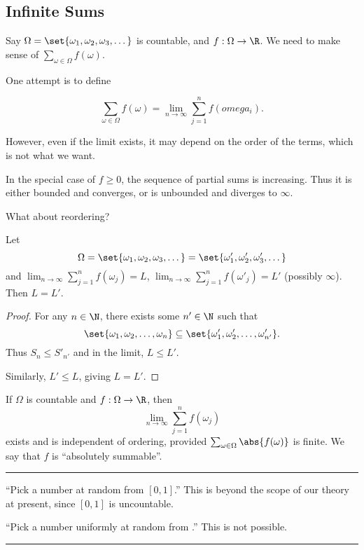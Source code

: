 
\subsection{Infinite Sums} \label{sec:infinite_sums}
Say $\Omega = \set{\omega_1, \omega_2, \omega_3, \dots}$ is countable, and
$f : \Omega \to \R$.
We need to make sense of $\sum_{\omega \in \Omega} f(\omega)$.

One attempt is to define
\begin{proposition}
    \[
        \sum_{\omega \in \Omega} f(\omega) = \lim_{n \to \infty}
            \sum_{j=1}^{n} f(omega_{i}).
    \]
\end{proposition}
However, even if the limit exists, it may depend on the order of the terms,
which is not what we want.

In the special case of $f \geq 0$, the sequence of partial sums is increasing.
Thus it is either bounded and converges, or is unbounded and diverges to
$\infty$.

What about reordering?
\begin{theorem}
    Let \[
        \Omega = \set{\omega_{1}, \omega_{2}, \omega_{3}, \dots}
        = \set{\omega'_{1}, \omega'_{2}, \omega'_{3}, \dots}
    \] and $\lim_{n \to \infty} \sum_{j = 1}^{n} f(\omega_{j}) = L$,
    $\lim_{n \to \infty} \sum_{j = 1}^{n} f(\omega'_{j}) = L'$ (possibly
    $\infty$).
    Then $L = L'$.
\end{theorem}
\begin{proof}
    For any $n \in \N$, there exists some $n' \in \N$ such that \[
        \set{\omega_{1}, \omega_{2}, \dots, \omega_{n}}
        \subseteq \set{\omega'_{1}, \omega'_{2}, \dots, \omega'_{n'}}.
    \] Thus $S_{n} \leq S'_{n'}$ and in the limit, $L \leq L'$.

    Similarly, $L' \leq L$, giving $L = L'$.
\end{proof}

\begin{theorem} \label{thm:countable:absolute_sum}
    If $\Omega$ is countable and $f : \Omega \to \R$, then \[
        \lim_{n \to \infty} \sum_{j = 1}^{n} f(\omega_{j})
    \] exists and is independent of ordering,
    provided $\sum_{\omega \in \Omega} \abs{f(\omega)}$ is finite.
    We say that $f$ is ``absolutely summable''.
\end{theorem}
\vspace{5pt} \hrule

\begin{examples}
    \item ``Pick a number at random from $[0, 1]$.''
        This is beyond the scope of our theory at present, since $[0, 1]$ is
        uncountable.
    \item ``Pick a number uniformly at random from \N.''
        This is not possible.
\end{examples}
\vspace{5pt} \hrule

